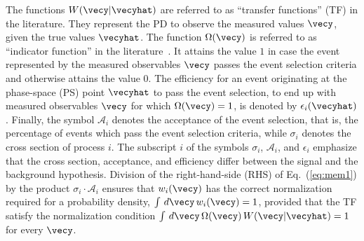 The functions $W(\vecy|\vecyhat)$ are referred to as ``transfer functions'' (TF) in the literature.
They represent the PD to observe the measured values $\vecy$, given the true values $\vecyhat$.
The function $\Omega(\vecy)$ is referred to as ``indicator function'' in the literature~\cite{Fiedler:2010sg,Volobouev:2011vb}.
It attains the value $1$ in case the event represented by the measured observables $\vecy$ passes the event selection criteria and otherwise attains the value $0$.
The efficiency for an event originating at the phase-space (PS) point
$\vecyhat$ to pass the event selection, \ie to end up with measured
observables $\vecy$ for which $\Omega(\vecy) = 1$,
is denoted by $\epsilon_{i}(\vecyhat)$. 
Finally, the symbol $\mathcal{A}_{i}$ denotes the acceptance of the event selection, 
that is, the percentage of events which pass the event selection criteria,
while $\sigma_{i}$ denotes the cross section of process $i$.
The subscript $i$ of the symbols $\sigma_{i}$, $\mathcal{A}_{i}$, and $\epsilon_{i}$ 
emphasize that the cross section, acceptance, and efficiency differ between the signal and the background hypothesis.
Division of the right-hand-side (RHS) of Eq.~(\ref{eq:mem1}) by the product $\sigma_{i} \cdot \mathcal{A}_{i}$
ensures that $w_{i}(\vecy)$ has the correct normalization required for a probability density, 
\ie $\int \, d\vecy \, w_{i}(\vecy) = 1$,
provided that the TF satisfy the normalization condition
$\int \, d\vecy \, \Omega(\vecy) \, W(\vecy|\vecyhat) = 1$
for every $\vecy$.

